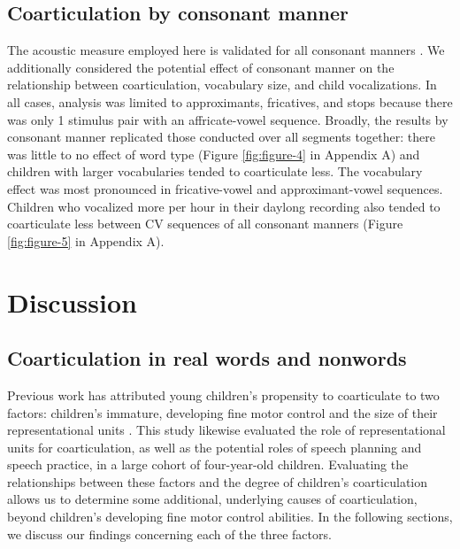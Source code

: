 \documentclass[a4paper,man,natbib,donotrepeattitle, apacite]{apa6}
\begin{document}
\subsection{Coarticulation by consonant manner}

The acoustic measure employed here is validated for all consonant manners \cite{cychoszSpectralTemporalMeasures2019,gerosaAnalyzingChildrenSpeech2006}. We additionally considered the potential effect of consonant manner on the relationship between coarticulation, vocabulary size, and child vocalizations. In all cases, analysis was limited to approximants, fricatives, and stops because there was only 1 stimulus pair with an affricate-vowel sequence. Broadly, the results by consonant manner replicated those conducted over all segments together: there was little to no effect of word type (Figure \ref{fig:figure-4} in Appendix A) and children with larger vocabularies tended to coarticulate less. The vocabulary effect was most pronounced in fricative-vowel and approximant-vowel sequences. Children who vocalized more per hour in their daylong recording also tended to coarticulate less between CV sequences of all consonant manners (Figure \ref{fig:figure-5} in Appendix A). 

\section{Discussion}

\subsection{Coarticulation in real words and nonwords}

Previous work has attributed young children’s propensity to coarticulate to two factors: children’s immature, developing fine motor control \cite{barbierWhatAnticipatoryCoarticulation2020,rubertusDevelopmentGesturalOrganization2018,zharkovaUltrasoundStudyDevelopment2018} and the size of their representational units \cite{nittrouerEmergencePhoneticSegments1989,nittrouerHowChildrenLearn1996,noiraySpokenLanguageDevelopment2019,zharkovaCoarticulationIndicatorSpeech2011}. This study likewise evaluated the role of representational units for coarticulation, as well as the potential roles of speech planning and speech practice, in a large cohort of four-year-old children. Evaluating the relationships between these factors and the degree of children’s coarticulation allows us to determine some additional, underlying causes of coarticulation, beyond children’s developing fine motor control abilities. In the following sections, we discuss our findings concerning each of the three factors.
\end{document}
